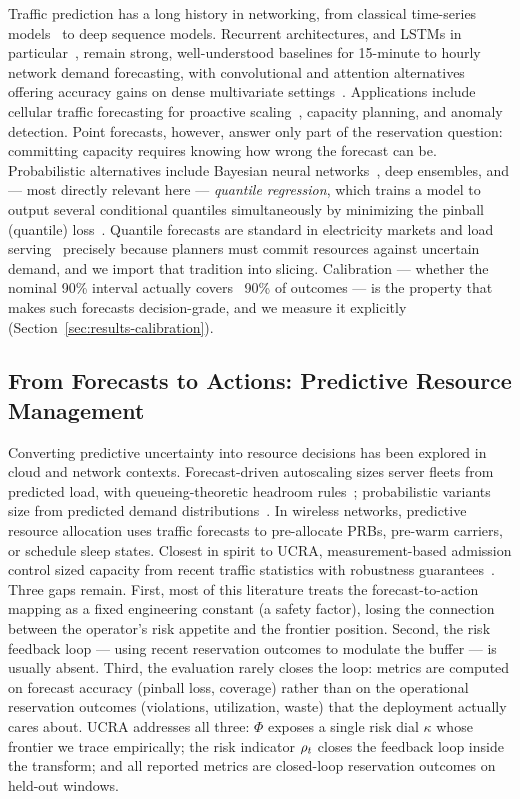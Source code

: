 Traffic prediction has a long history in networking, from
classical time-series models~\cite{box2015time} to deep sequence
models. Recurrent architectures, and LSTMs in
particular~\cite{hochreiter1997lstm}, remain strong, well-understood
baselines for 15-minute to hourly network demand forecasting, with
convolutional and attention alternatives offering accuracy gains on
dense multivariate settings~\cite{zhang2017deep}. Applications
include cellular traffic forecasting for proactive
scaling~\cite{zhang2019transfer}, capacity planning, and anomaly
detection. Point forecasts, however, answer only part of the
reservation question: committing capacity requires knowing how wrong
the forecast can be. Probabilistic alternatives include Bayesian
neural networks~\cite{gal2016dropout}, deep ensembles, and --- most
directly relevant here --- \emph{quantile regression}, which trains a
model to output several conditional quantiles simultaneously by
minimizing the pinball (quantile) loss~\cite{koenker1978regression}.
Quantile forecasts are standard in electricity markets and load
serving~\cite{hong2016probabilistic} precisely because planners must
commit resources against uncertain demand, and we import that
tradition into slicing. Calibration --- whether the nominal 90\%
interval actually covers ~90\% of outcomes --- is the property that
makes such forecasts decision-grade, and we measure it explicitly
(Section~\ref{sec:results-calibration}).

\subsection{From Forecasts to Actions: Predictive Resource Management}

Converting predictive uncertainty into resource decisions has been
explored in cloud and network contexts. Forecast-driven autoscaling
sizes server fleets from predicted load, with queueing-theoretic
headroom rules~\cite{gandhi2012autoscale};
probabilistic variants size from predicted demand
distributions~\cite{ islam2012provisioning}. In wireless networks,
predictive resource allocation uses traffic forecasts to pre-allocate
PRBs, pre-warm carriers, or schedule sleep states. Closest in spirit
to UCRA, measurement-based admission control sized capacity from
recent traffic statistics with robustness
guarantees~\cite{grossglauser1999adaptive}.
Three gaps remain. First, most of this literature treats the
forecast-to-action mapping as a fixed engineering constant (a safety
factor), losing the connection between the operator's risk appetite
and the frontier position. Second, the risk feedback loop --- using
recent reservation outcomes to modulate the buffer --- is usually
absent. Third, the evaluation rarely closes the loop: metrics are
computed on forecast accuracy (pinball loss, coverage) rather than on
the operational reservation outcomes (violations, utilization, waste)
that the deployment actually cares about. UCRA addresses all three:
$\Phi$ exposes a single risk dial $\kappa$ whose frontier we trace
empirically; the risk indicator $\rho_t$ closes the feedback loop
inside the transform; and all reported metrics are closed-loop
reservation outcomes on held-out windows.

